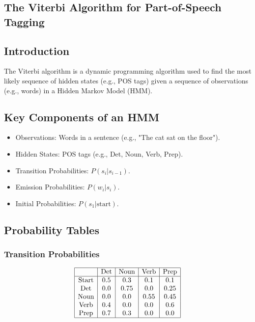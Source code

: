 \begin{notechapter}
\chapter{The Viterbi Algorithm for Part-of-Speech Tagging}\label{ch:viterbi-pos}

\section{Introduction}
The Viterbi algorithm is a dynamic programming algorithm 
used to find the most likely sequence of hidden states 
(e.g., POS tags) given a sequence of observations (e.g., 
words) in a Hidden Markov Model (HMM).

\section{Key Components of an HMM}
\begin{itemize}
    \item Observations: Words in a sentence (e.g., "The cat 
          sat on the floor").
    \item Hidden States: POS tags (e.g., Det, Noun, Verb, 
          Prep).
    \item Transition Probabilities: \( P(s_i | s_{i-1}) \).
    \item Emission Probabilities: \( P(w_i | s_i) \).
    \item Initial Probabilities: \( P(s_1 | \text{start}) \).
\end{itemize}

\section{Probability Tables}
\subsection{Transition Probabilities}
\[
\begin{array}{|c|c|c|c|c|}
\hline
 & \text{Det} & \text{Noun} & \text{Verb} & \text{Prep} \\
\hline
\text{Start} & 0.5 & 0.3 & 0.1 & 0.1 \\
\text{Det} & 0.0 & 0.75 & 0.0 & 0.25 \\
\text{Noun} & 0.0 & 0.0 & 0.55 & 0.45 \\
\text{Verb} & 0.4 & 0.0 & 0.0 & 0.6 \\
\text{Prep} & 0.7 & 0.3 & 0.0 & 0.0 \\
\hline
\end{array}
\]


\end{notechapter}
